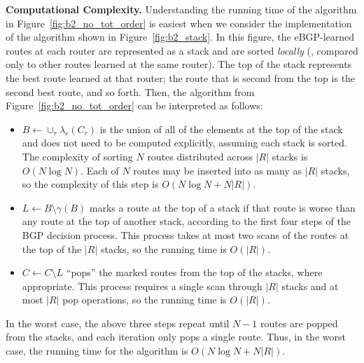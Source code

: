 \textbf{Computational Complexity.}
Understanding the running time of the algorithm in
Figure~\ref{fig:b2_no_tot_order} is easiest when we consider the
implementation of the algorithm shown in
Figure~\ref{fig:b2_stack}.   In this figure, the eBGP-learned routes at
each router are represented as a stack and are sorted {\em locally}
(\ie, compared only to other routes learned at the same router).  The
top of the stack represents the best route learned at that router;
the route that is second from the top is the second best route, and
so forth.  Then, the algorithm from Figure~\ref{fig:b2_no_tot_order}
can be interpreted as follows:
\begin{itemize}
\itemsep=-1pt
\item $B \leftarrow \cup_r \lambda_r(C_r)$ is the union of all of the
  elements at the top of the stack and does not need to be computed
  explicitly, assuming each stack is sorted.  The complexity of sorting
  $N$ routes distributed across $|R|$ stacks is $O(N \log N)$.  Each of
  $N$ routes may be inserted into as many as $|R|$ stacks, so the
  complexity of this step is $O(N \log N + N|R|)$.
\item $L \leftarrow B \setminus \gamma(B)$ marks a route at the top
  of a stack if that route is worse than any route at the top of
  another stack, according to the first four steps of the BGP decision
  process.  This process takes at most two scans of the routes at the
  top of the $|R|$ stacks, so the running time is $O(|R|)$.
\item $C \leftarrow C \setminus L$ ``pops'' the marked routes from the
  top of 
  the stacks, where appropriate.  This process requires a single scan
  through $|R|$ stacks and at most $|R|$ pop operations, so the running time
  is $O(|R|)$.  
\end{itemize}

In the worst case, the above three steps repeat until $N-1$ routes are
popped from the stacks, and each iteration only pops a single route.
Thus, in the worst case, the running time for the algorithm is $O(N \log
N + N|R|)$.






